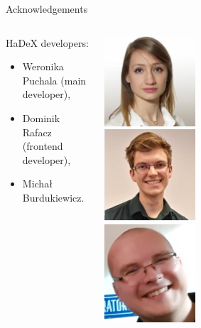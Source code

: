 \documentclass{beamer}\usepackage[]{graphicx}\usepackage[]{color}
\begin{document}
\begin{frame}{Acknowledgements}

\begin{columns}
\begin{column}{0.4\textwidth}
HaDeX developers:
  \begin{itemize}
    \item Weronika Puchala (main developer),
    \item Dominik Rafacz (frontend developer),
    \item Michał Burdukiewicz.
  \end{itemize}
\end{column}
\begin{column}{0.6\textwidth}  %
  \begin{center}
    \includegraphics[width=0.35\textwidth]{static_figure/weronika.png}
    \\
    \includegraphics[width=0.35\textwidth]{static_figure/dominik.png}
    \\
    \includegraphics[width=0.35\textwidth,height=0.35\textwidth]{static_figure/michal.jpg}
  \end{center}
\end{column}
\end{columns}
\end{frame} 
\end{document}
